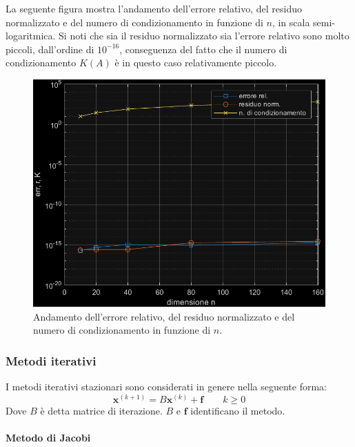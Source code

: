 \begin{enumerate}
    La seguente figura mostra l'andamento dell'errore relativo, del residuo normalizzato e del numero di condizionamento in funzione di $n$, in scala semi-logaritmica. Si noti che sia il residuo normalizzato sia l'errore relativo sono molto piccoli, dall'ordine di $10^{-16}$, conseguenza del fatto che il numero di condizionamento $K\left(A\right)$ è in questo caso relativamente piccolo.

    \begin{figure}[!htp]
        \centering
        \includegraphics[width=.7\textwidth]{img/metodi-diretti.pdf}
        \caption{Andamento dell'errore relativo, del residuo normalizzato e del numero di condizionamento in funzione di $n$.}
    \end{figure}
\end{enumerate}

\newpage

\subsubsection{Metodi iterativi}

I metodi iterativi stazionari sono considerati in genere nella seguente forma:
\begin{equation*}
    \mathbf{x}^{\left(k+1\right)} = B\mathbf{x}^{\left(k\right)} + \mathbf{f} \hspace{2em} k \ge 0
\end{equation*}
Dove $B$ è detta matrice di iterazione. $B$ e $\mathbf{f}$ identificano il metodo.

\paragraph{Metodo di Jacobi}

